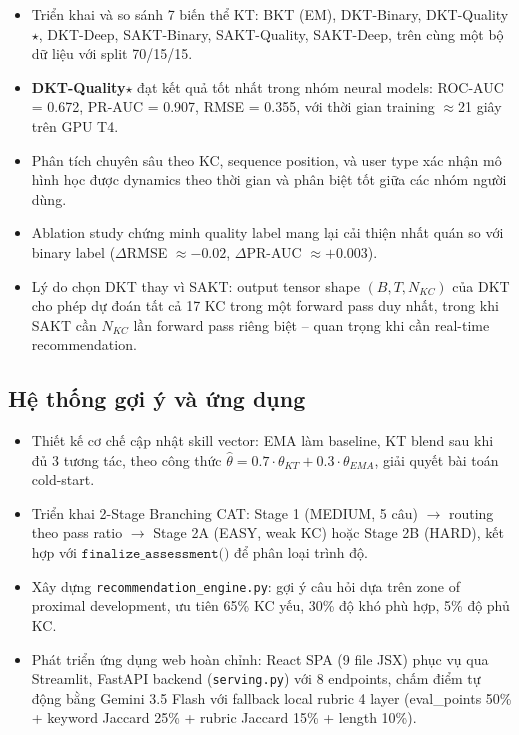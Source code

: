 \documentclass[12pt, a4paper]{report}
\begin{document}
\begin{itemize}
  \item Triển khai và so sánh 7 biến thể KT: BKT (EM), DKT-Binary, DKT-Quality$\star$, DKT-Deep, SAKT-Binary, SAKT-Quality, SAKT-Deep, trên cùng một bộ dữ liệu với split 70/15/15.
  \item \textbf{DKT-Quality$\star$} đạt kết quả tốt nhất trong nhóm neural models: ROC-AUC = 0.672, PR-AUC = 0.907, RMSE = 0.355, với thời gian training $\approx$21 giây trên GPU T4.
  \item Phân tích chuyên sâu theo KC, sequence position, và user type xác nhận mô hình học được dynamics theo thời gian và phân biệt tốt giữa các nhóm người dùng.
  \item Ablation study chứng minh quality label mang lại cải thiện nhất quán so với binary label ($\Delta$RMSE $\approx -0.02$, $\Delta$PR-AUC $\approx +0.003$).
  \item Lý do chọn DKT thay vì SAKT: output tensor shape $(B, T, N_{KC})$ của DKT cho phép dự đoán tất cả 17 KC trong một forward pass duy nhất, trong khi SAKT cần $N_{KC}$ lần forward pass riêng biệt -- quan trọng khi cần real-time recommendation.
\end{itemize}

\subsection{Hệ thống gợi ý và ứng dụng}

\begin{itemize}
  \item Thiết kế cơ chế cập nhật skill vector: EMA làm baseline, KT blend sau khi đủ 3 tương tác, theo công thức $\hat{\theta} = 0.7 \cdot \theta_{KT} + 0.3 \cdot \theta_{EMA}$, giải quyết bài toán cold-start.
  \item Triển khai 2-Stage Branching CAT: Stage 1 (MEDIUM, 5 câu) $\to$ routing theo pass ratio $\to$ Stage 2A (EASY, weak KC) hoặc Stage 2B (HARD), kết hợp với $\texttt{finalize\_assessment()}$ để phân loại trình độ.
  \item Xây dựng \texttt{recommendation\_engine.py}: gợi ý câu hỏi dựa trên zone of proximal development, ưu tiên 65\% KC yếu, 30\% độ khó phù hợp, 5\% độ phủ KC.
  \item Phát triển ứng dụng web hoàn chỉnh: React SPA (9 file JSX) phục vụ qua Streamlit, FastAPI backend (\texttt{serving.py}) với 8 endpoints, chấm điểm tự động bằng Gemini 3.5 Flash với fallback local rubric 4 layer (eval\_points 50\% + keyword Jaccard 25\% + rubric Jaccard 15\% + length 10\%).
\end{itemize}
\end{document}
